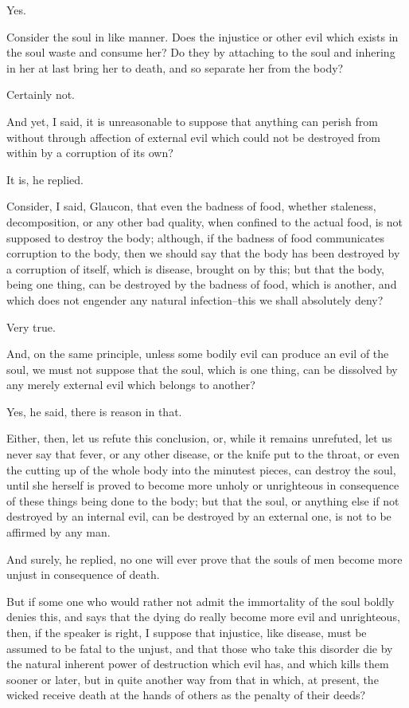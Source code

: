 Yes.

Consider the soul in like manner. Does the injustice or other evil which
exists in the soul waste and consume her? Do they by attaching to the
soul and inhering in her at last bring her to death, and so separate her
from the body?

Certainly not.

And yet, I said, it is unreasonable to suppose that anything can perish
from without through affection of external evil which could not be
destroyed from within by a corruption of its own?

It is, he replied.

Consider, I said, Glaucon, that even the badness of food, whether
staleness, decomposition, or any other bad quality, when confined to
the actual food, is not supposed to destroy the body; although, if the
badness of food communicates corruption to the body, then we should say
that the body has been destroyed by a corruption of itself, which is
disease, brought on by this; but that the body, being one thing, can be
destroyed by the badness of food, which is another, and which does not
engender any natural infection--this we shall absolutely deny?

Very true.

And, on the same principle, unless some bodily evil can produce an evil
of the soul, we must not suppose that the soul, which is one thing, can
be dissolved by any merely external evil which belongs to another?

Yes, he said, there is reason in that.

Either, then, let us refute this conclusion, or, while it remains
unrefuted, let us never say that fever, or any other disease, or the
knife put to the throat, or even the cutting up of the whole body into
the minutest pieces, can destroy the soul, until she herself is proved
to become more unholy or unrighteous in consequence of these things
being done to the body; but that the soul, or anything else if not
destroyed by an internal evil, can be destroyed by an external one, is
not to be affirmed by any man.

And surely, he replied, no one will ever prove that the souls of men
become more unjust in consequence of death.

But if some one who would rather not admit the immortality of the soul
boldly denies this, and says that the dying do really become more
evil and unrighteous, then, if the speaker is right, I suppose that
injustice, like disease, must be assumed to be fatal to the unjust, and
that those who take this disorder die by the natural inherent power of
destruction which evil has, and which kills them sooner or later, but
in quite another way from that in which, at present, the wicked receive
death at the hands of others as the penalty of their deeds?

